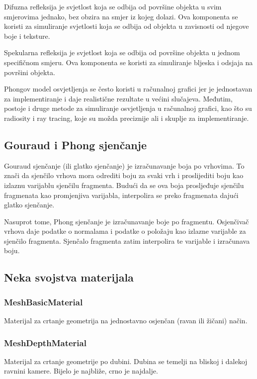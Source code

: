 \documentclass[a4paper,12pt]{article}
\begin{document}
Difuzna refleksija je svjetlost koja se odbija od površine objekta u svim smjerovima jednako, bez obzira na smjer iz kojeg dolazi. Ova komponenta se koristi za simuliranje svjetlosti koja se odbija od objekta u zavisnosti od njegove boje i teksture.

Spekularna refleksija je svjetlost koja se odbija od površine objekta u jednom specifičnom smjeru. Ova komponenta se koristi za simuliranje bljeska i odsjaja na površini objekta.

Phongov model osvjetljenja se često koristi u računalnoj grafici jer je jednostavan za implementiranje i daje realistične rezultate u većini slučajeva. Međutim, postoje i druge metode za simuliranje osvjetljenja u računalnoj grafici, kao što su radiosity i ray tracing, koje su možda preciznije ali i skuplje za implementiranje.
\subsection{Gouraud i Phong sjenčanje}

Gouraud sjenčanje (ili glatko sjenčanje) je izračunavanje boja po vrhovima. 
To znači da sjenčilo vrhova mora odrediti boju za svaki vrh i proslijediti boju kao izlaznu varijablu sjenčilu fragmenta. 
Budući da se ova boja prosljeđuje sjenčilu fragmenata kao promjenjiva varijabla, interpolira se preko fragmenata dajući glatko sjenčanje.

Nasuprot tome, Phong sjenčanje je izračunavanje boje po fragmentu. 
Osjenčivač vrhova daje podatke o normalama i podatke o položaju kao izlazne varijable za sjenčilo fragmenta. 
Sjenčalo fragmenta zatim interpolira te varijable i izračunava boju.

\subsection{Neka svojstva materijala}
\subsubsection{MeshBasicMaterial}

\hspace{10mm} Materijal za crtanje geometrija na jednostavno osjenčan (ravan ili žičani) način.

\subsubsection{MeshDepthMaterial}
\hspace{10mm} Materijal za crtanje geometrije po dubini. Dubina se temelji na bliskoj i dalekoj ravnini kamere. Bijelo je najbliže, crno je najdalje.
\end{document}
